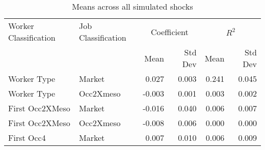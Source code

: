 \begin{table}
\centering
\caption{Means across all simulated shocks}
\label{table:all_sector_shocks_means}
\begin{tabular}{@{\extracolsep{10pt}}llrrrr}
\toprule
Worker Classification & Job Classification & \multicolumn{2}{c}{Coefficient} & \multicolumn{2}{c}{$R^2$} \\ \cline{3-4}\cline{5-6}
               \hfill &             \hfill &        Mean & Std Dev &   Mean & Std Dev \\
\midrule
          Worker Type &             Market &       0.027 &   0.003 &  0.241 &   0.045 \\
          Worker Type &          Occ2Xmeso &      -0.003 &   0.001 &  0.003 &   0.002 \\
      First Occ2XMeso &             Market &      -0.016 &   0.040 &  0.006 &   0.007 \\
      First Occ2XMeso &          Occ2Xmeso &      -0.008 &   0.006 &  0.000 &   0.000 \\
           First Occ4 &             Market &       0.007 &   0.010 &  0.006 &   0.009 \\
\bottomrule
\end{tabular}
\end{table}
